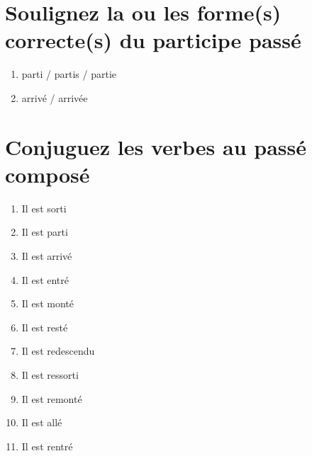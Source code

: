 \section{Soulignez la ou les forme(s) correcte(s) du participe passé}

\begin{enumerate}
    \item parti / partis / partie 
    \item arrivé / arrivée
\end{enumerate}

\section{Conjuguez les verbes au passé composé}

\begin{enumerate}
    \item Il est sorti
    \item Il est parti 
    \item Il est arrivé 
    \item Il est entré 
    \item Il est monté
    \item Il est resté
    \item Il est redescendu 
    \item Il est ressorti
    \item Il est remonté 
    \item Il est allé 
    \item Il est rentré 
\end{enumerate}